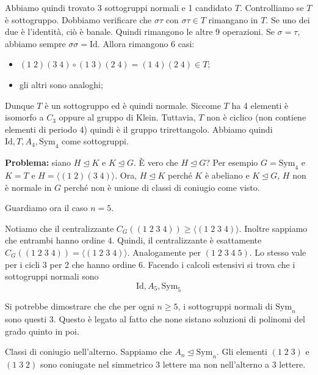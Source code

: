 \documentclass[a4paper]{article}
\begin{document}
Abbiamo quindi trovato \(3\) sottogruppi normali e 1 candidato \(T\).
Controlliamo se \(T\) è sottogruppo.
Dobbiamo verificare che \(\sigma\tau\) con \(\sigma\tau \in T\) rimangano in \(T\).
Se uno dei due è l'identità, ciò è banale. Quindi rimangono le altre 9 operazioni.
Se \(\sigma = \tau\), abbiamo sempre \(\sigma\sigma = \text{Id}\).
Allora rimangono 6 casi:
\begin{itemize}
    \item \((1\;2)(3\;4)\circ (1\;3)(2\;4) = (1\;4)(2\;4) \in T\);
    \item gli altri sono analoghi;
\end{itemize}
Dunque \(T\) è un sottogruppo ed è quindi normale.
Siccome \(T\) ha 4 elementi è isomorfo a \(C_3\) oppure al gruppo di Klein.
Tuttavia, \(T\) non è ciclico (non contiene elementi di periodo 4) quindi è il gruppo trirettangolo.
Abbiamo quindi \(\text{Id}, T, A_4, \text{Sym}_4\) come sottogruppi.

\textbf{Problema:} siano \(H \unlhd K\)
e \(K \unlhd G\). È vero che \(H \unlhd G\)? Per esempio \(G = \text{Sym}_4\)
e \(K=T\) e \(H = \langle(1\;2)(3\;4)\rangle\).
Ora, \(H \unlhd K\) perché \(K\) è abeliano e \(K \unlhd G\),
\(H\) non è normale in \(G\) perché non è unione di classi di coniugio come visto.

Guardiamo ora il caso \(n=5\).

Notiamo che il centralizzante \(C_G((1\;2\;3\;4)) \geq \langle(1\;2\;3\;4)\rangle\).
Inoltre sappiamo che entrambi hanno ordine \(4\). Quindi, il centralizzante
è esattamente \(C_G((1\;2\;3\;4)) = \langle(1\;2\;3\;4)\rangle\).
Analogamente per \((1\;2\;3\;4\;5)\). Lo stesso vale per i cicli 3 per 2 che hanno ordine 6.
Facendo i calcoli estensivi si trova che i sottogruppi normali sono
\[
    \text{Id}, A_5, \text{Sym}_5
\]

Si potrebbe dimostrare che che per ogni \(n \geq 5\), i sottogruppi normali di \(\text{Sym}_n\)
sono questi 3. Questo è legato al fatto che none sistano soluzioni di polinomi
del grado quinto in poi.

Classi di coniugio nell'alterno.
Sappiamo che \(A_n \unlhd \text{Sym}_n\).
Gli elementi \((1\;2\;3)\) e \((1\;3\;2)\) sono coniugate nel simmetrico
3 lettere ma non nell'alterno a 3 lettere.

\end{document}
